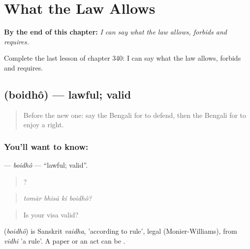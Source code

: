 
\chapter{What the Law Allows}
\label{ch:bn-what-the-law-allows}

\begin{chapteropening}
\textbf{By the end of this chapter:} \emph{I can say what the law allows, forbids and requires.}

Complete the last lesson of chapter 340: I can say what the law allows, forbids and requires.
\end{chapteropening}

\section[\texorpdfstring{\bn{বৈধ} (boidhô)}{বৈধ (boidhô)}]{ (boidhô) — lawful; valid}

\label{lesson:BN-C340-boidho}



\begin{quote}
Before the new one: say the Bengali for to defend, then the Bengali for to enjoy a right.
\end{quote}

\subsection*{You'll want to know: }
\textbf{} — \emph{boidhô} — \textquotedblleft{}lawful; valid\textquotedblright{}.

\begin{quote}
   ?
\end{quote}

\begin{quote}
\emph{tomār bhisā ki boidhô?}
\end{quote}

\begin{quote}
Is your visa valid?
\end{quote}

\begin{cousinweb}
\textbf{} (\emph{boidhô}) is Sanskrit \emph{vaidha}, 'according to rule', legal (Monier-Williams), from \emph{vidhi} 'a rule'. A paper or an act can be .
\end{cousinweb}

